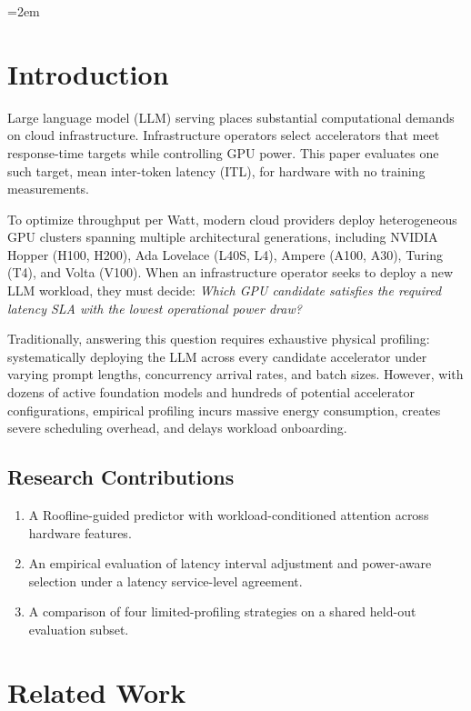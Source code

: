 \documentclass[preprint,12pt]{elsarticle}
\providecommand{\tightlist}{\setlength{\itemsep}{0pt}\setlength{\parskip}{0pt}}
\begin{document}
\linenumbers
\emergencystretch=2em

\section{Introduction}\label{introduction}

Large language model (LLM) serving places substantial computational
demands on cloud infrastructure. Infrastructure operators select
accelerators that meet response-time targets while controlling GPU
power. This paper evaluates one such target, mean inter-token latency
(ITL), for hardware with no training measurements.

To optimize throughput per Watt, modern cloud providers deploy
heterogeneous GPU clusters spanning multiple architectural generations,
including NVIDIA Hopper (H100, H200), Ada Lovelace (L40S, L4), Ampere
(A100, A30), Turing (T4), and Volta (V100). When an infrastructure
operator seeks to deploy a new LLM workload, they must decide:
\emph{Which GPU candidate satisfies the required latency SLA with the
lowest operational power draw?}

Traditionally, answering this question requires exhaustive physical
profiling: systematically deploying the LLM across every candidate
accelerator under varying prompt lengths, concurrency arrival rates, and
batch sizes. However, with dozens of active foundation models and
hundreds of potential accelerator configurations, empirical profiling
incurs massive energy consumption, creates severe scheduling overhead,
and delays workload onboarding.

\subsection{Research Contributions}\label{research-contributions}

\begin{enumerate}
\def\labelenumi{\arabic{enumi}.}
\tightlist
\item
  A Roofline-guided predictor with workload-conditioned attention across
  hardware features.
\item
  An empirical evaluation of latency interval adjustment and power-aware
  selection under a latency service-level agreement.
\item
  A comparison of four limited-profiling strategies on a shared held-out
  evaluation subset.
\end{enumerate}

\section{Related Work}\label{related-work}
\end{document}
